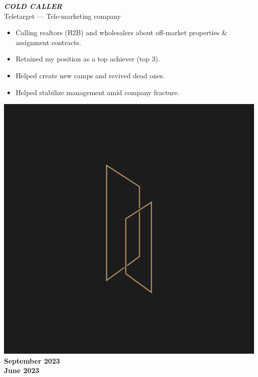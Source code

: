 \documentclass[10pt]{article}
\newcommand{\fancy}[1]{\Large\textbf{\textit{#1}}}
\begin{document}
\vspace{3em}

\noindent
\begin{minipage}{0.7\textwidth}
 \fancy{COLD CALLER} \\
{\large Teletarget --- Tele-marketing company} \\
\begin{itemize}
	\item Calling realtors (B2B) and wholesalers about off-market properties \& assignment contracts.
    \item Retained my position as a top achiever (top 3).
    \item Helped create new camps and revived dead ones.
    \item Helped stabilize management amid company fracture.
\end{itemize}   
\end{minipage}
\hspace{35pt}
\begin{minipage}{0.2\textwidth}
\begin{center}
\vspace{10pt}
\includegraphics[width=\textwidth]{tt_coldcalling.jpg} \\
    \large\textbf{September 2023\\June 2023} %
\end{center}
\end{minipage} %
\end{document}
